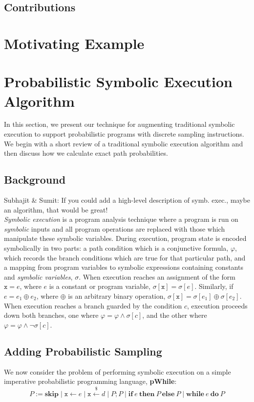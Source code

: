 \documentclass[acmsmall]{acmart}\settopmatter{}
\begin{document}
	
	\subsection{Contributions}
	\label{sec:contrib}
	
	\section{Motivating Example}
	\label{sec:example}
	
	\section{Probabilistic Symbolic Execution Algorithm}
	\label{sec:pse}
	In this section, we present our technique for augmenting traditional symbolic execution to support probabilistic programs with discrete sampling instructions. 
	We begin with a short review of a traditional symbolic execution algorithm and then discuss how we calculate exact path probabilities.
	
	\subsection{Background}
	\label{sec:trad_sym_exec}
	{\color{red} Subhajit \& Sumit: If you could add a high-level description of symb. exec., maybe an algorithm, that would be great!\\}
	\textit{Symbolic execution} is a program analysis technique where a program is run on \textit{symbolic} inputs and all program operations are replaced with those which manipulate these symbolic variables.
	During execution, program state is encoded symbolically in two parts: a path condition which is a conjunctive formula, $\varphi$, which records the branch conditions which are true for that particular path, and a mapping from program variables to symbolic expressions containing constants and \textit{symbolic variables}, $\sigma$.
	When execution reaches an assignment of the form $\mathtt{x} = e$, where $e$ is a constant or program variable, $\sigma[\mathtt{x}] = \sigma[e]$.
	Similarly, if $e = e_1 \oplus e_2$, where $\oplus$ is an arbitrary binary operation, $\sigma[\mathtt{x}] = \sigma[e_1] \oplus \sigma[e_2]$. 
	When execution reaches a branch guarded by the condition $c$, execution proceeds down both branches, one where $\varphi = \varphi \wedge \sigma[c]$, and the other where $\varphi = \varphi \wedge \neg \sigma[c]$. 
	
	\subsection{Adding Probabilistic Sampling}
	We now consider the problem of performing symbolic execution on a simple imperative probabilistic programming language, \textbf{pWhile}:
	\[
	P := \mathbf{skip} \mid \mathtt{x} \leftarrow e \mid \mathtt{x} \xleftarrow{\$} d \mid P ; P \mid \mathbf{if}~e~\mathbf{then}~P~\mathbf{else}~P \mid \mathbf{while}~e~\mathbf{do}~P 
	\]
	
\end{document}
